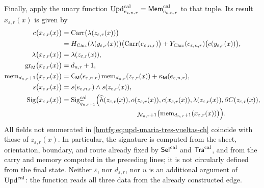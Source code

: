 Finally, apply the unary function
\(\operatorname{Upd}^{\rm cal}_{e_{\varepsilon,n,r}}
=\mathsf{Mem}^{\rm cal}_{e_{\varepsilon,n,r}}\) to that tuple. Its result
\(x_{\varepsilon,r}(x)\) is given by
\begin{equation}
\begin{aligned}
 c\bigl(x_{\varepsilon,r}(x)\bigr)
   &=\operatorname{Carr}\bigl(\lambda(z_{\varepsilon,r}(x))\bigr)\\
   &=H_{\rm Carr}(\lambda(y_{\varepsilon,r}(x)))
       \bigl(\operatorname{Carr}(e_{\varepsilon,n,r})\bigr)
     +Y_{\rm Carr}(e_{\varepsilon,n,r})
       \bigl(c(y_{\varepsilon,r}(x))\bigr),\\
 \lambda\bigl(x_{\varepsilon,r}(x)\bigr)
   &=\lambda(z_{\varepsilon,r}(x)),\\
 \operatorname{gr}_{\mathsf M}
      \bigl(x_{\varepsilon,r}(x)\bigr)
   &=d_{n,r}+1,\\
 \operatorname{mem}_{d_{n,r}+1}
       \bigl(x_{\varepsilon,r}(x)\bigr)
   &=\mathsf C_{\mathsf M}(e_{\varepsilon,n,r})
       \operatorname{mem}_{d_{n,r}}(z_{\varepsilon,r}(x))
     +\kappa_{\mathsf M}(e_{\varepsilon,n,r}),\\
 s\bigl(x_{\varepsilon,r}(x)\bigr)
   &=s(e_{\varepsilon,n,r})\wedge s(z_{\varepsilon,r}(x)),\\
 \operatorname{Sig}\bigl(x_{\varepsilon,r}(x)\bigr)
   &=\operatorname{Sig}^{\rm cal}_{\widetilde q_{n,r+1}}
       \Bigl(\widehat h(z_{\varepsilon,r}(x)),
             o(z_{\varepsilon,r}(x)),
             c(x_{\varepsilon,r}(x)),
             \lambda(z_{\varepsilon,r}(x)),
             \partial C(z_{\varepsilon,r}(x)),\\[-2pt]
   &\hspace{112pt}
             \jmath_{d_{n,r}+1}
              \bigl(\operatorname{mem}_{d_{n,r}+1}
                 (x_{\varepsilon,r}(x))\bigr)\Bigr).
\end{aligned}
\label{hmtfg:eq:upd-unaria-tres-vueltas-ch}
\end{equation}
All fields not enumerated in \eqref{hmtfg:eq:upd-unaria-tres-vueltas-ch} coincide
with those of \(z_{\varepsilon,r}(x)\). In particular, the signature is
computed from the sheet, orientation, boundary, and route already fixed by
\(\mathsf{Sel}^{\rm cal}\) and \(\mathsf{Tra}^{\rm cal}\), and from the carry
and memory computed in the preceding lines; it is not circularly defined from
the final state. Neither \(\varepsilon\), nor \(d_{\varepsilon,r}\), nor
\(u\) is an additional argument of \(\operatorname{Upd}^{\rm cal}\): the
function reads all three data from the already constructed edge.

